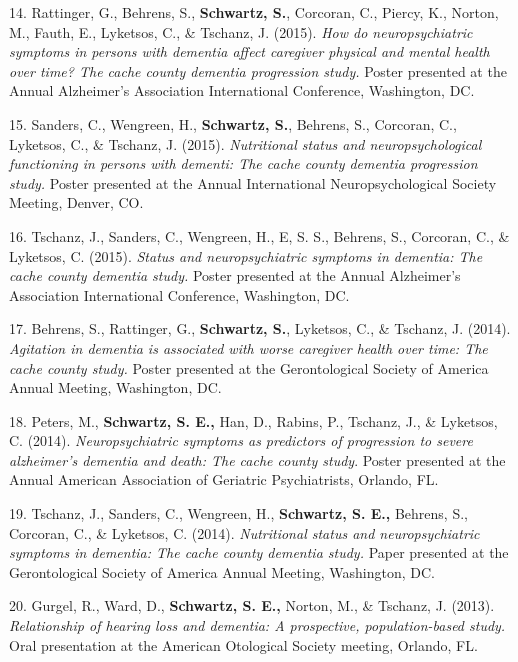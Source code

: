 \documentclass[11pt,a4paper,]{moderncv}
\newlength{\cslhangindent}
\newenvironment{CSLReferences}[2] %
 {\begin{list}{}{%
  \setlength{\itemindent}{0pt}
  \setlength{\leftmargin}{0pt}
  \setlength{\parsep}{0pt}
  \ifodd #1
   \setlength{\leftmargin}{\cslhangindent}
   \setlength{\itemindent}{-1\cslhangindent}
  \fi
  \setlength{\itemsep}{#2\baselineskip}}}
 {\end{list}}
\begin{document}
\begin{CSLReferences}{1}{0}
14. Rattinger, G., Behrens, S., \textbf{Schwartz, S.}, Corcoran, C.,
Piercy, K., Norton, M., Fauth, E., Lyketsos, C., \& Tschanz, J. (2015).
\emph{How do neuropsychiatric symptoms in persons with dementia affect
caregiver physical and mental health over time? The cache county
dementia progression study.} Poster presented at the Annual Alzheimer's
Association International Conference, Washington, DC.

15. Sanders, C., Wengreen, H., \textbf{Schwartz, S.}, Behrens, S.,
Corcoran, C., Lyketsos, C., \& Tschanz, J. (2015). \emph{Nutritional
status and neuropsychological functioning in persons with dementi: The
cache county dementia progression study.} Poster presented at the Annual
International Neuropsychological Society Meeting, Denver, CO.

16. Tschanz, J., Sanders, C., Wengreen, H., E, S. S., Behrens, S.,
Corcoran, C., \& Lyketsos, C. (2015). \emph{Status and neuropsychiatric
symptoms in dementia: The cache county dementia study.} Poster presented
at the Annual Alzheimer's Association International Conference,
Washington, DC.

17. Behrens, S., Rattinger, G., \textbf{Schwartz, S.}, Lyketsos, C., \&
Tschanz, J. (2014). \emph{Agitation in dementia is associated with worse
caregiver health over time: The cache county study.} Poster presented at
the Gerontological Society of America Annual Meeting, Washington, DC.

18. Peters, M., \textbf{Schwartz, S. E.,} Han, D., Rabins, P., Tschanz,
J., \& Lyketsos, C. (2014). \emph{Neuropsychiatric symptoms as
predictors of progression to severe alzheimer's dementia and death: The
cache county study}. Poster presented at the Annual American Association
of Geriatric Psychiatrists, Orlando, FL.

19. Tschanz, J., Sanders, C., Wengreen, H., \textbf{Schwartz, S. E.,}
Behrens, S., Corcoran, C., \& Lyketsos, C. (2014). \emph{Nutritional
status and neuropsychiatric symptoms in dementia: The cache county
dementia study.} Paper presented at the Gerontological Society of
America Annual Meeting, Washington, DC.

20. Gurgel, R., Ward, D., \textbf{Schwartz, S. E.,} Norton, M., \&
Tschanz, J. (2013). \emph{Relationship of hearing loss and dementia: A
prospective, population-based study.} Oral presentation at the American
Otological Society meeting, Orlando, FL.


\end{CSLReferences}
\end{document}
